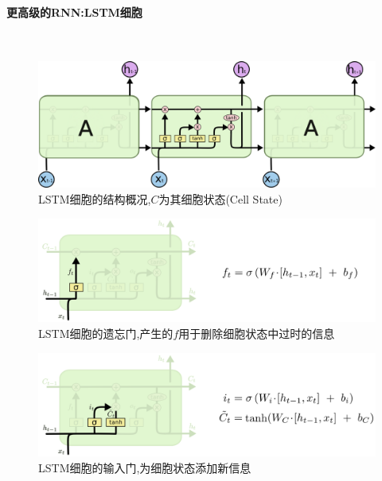 \paragraph{更高级的RNN:LSTM细胞}\ \par
\begin{figure}[htbp!]
    \centering
    \includegraphics[width = 1.\textwidth]{chap/img/LSTM3-chain.png}
    \caption{
        LSTM细胞的结构概况,$C$为其细胞状态(Cell State)\supercite{Understanding-LSTMs}
        }\label{fig:lstm_cell}
\end{figure}
\par
\begin{figure}[htbp!]
    \centering
    \includegraphics[width = 1.\textwidth]{chap/img/LSTM3-focus-f.png}
    \caption{
        LSTM细胞的遗忘门,产生的$f$用于删除细胞状态中过时的信息\supercite{Understanding-LSTMs}
        }\label{fig:lstm_f}
\end{figure}
\par
\begin{figure}[htbp!]
    \centering
    \includegraphics[width = 1.\textwidth]{chap/img/LSTM3-focus-i.png}
    \caption{
        LSTM细胞的输入门,为细胞状态添加新信息\supercite{Understanding-LSTMs}
        }\label{fig:lstm_i}
\end{figure}
